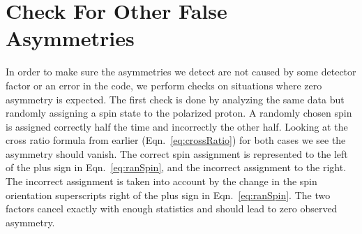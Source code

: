 \documentclass[letterpaper, abstract = on,listof=totoc, bibliography=totoc]{scrreprt}
\begin{document}
%
%







\section{Check For Other False Asymmetries}
In order to make sure the asymmetries we detect are not caused by some detector factor or an error in the code, we perform checks on situations where zero asymmetry is expected. The first check is done by analyzing the same data but randomly assigning a spin state to the polarized proton. A randomly chosen spin is assigned correctly half the time and incorrectly the other half. Looking at the cross ratio formula from earlier (Eqn.~\ref{eq:crossRatio}) for both cases we see the asymmetry should vanish. The correct spin assignment is represented to the left of the plus sign in Eqn.~\ref{eq:ranSpin}, and the incorrect assignment to the right. The incorrect assignment is taken into account by the change in the spin orientation superscripts right of the plus sign in Eqn.~\ref{eq:ranSpin}. The two factors cancel exactly with enough statistics and should lead to zero observed asymmetry. 
\end{document}
